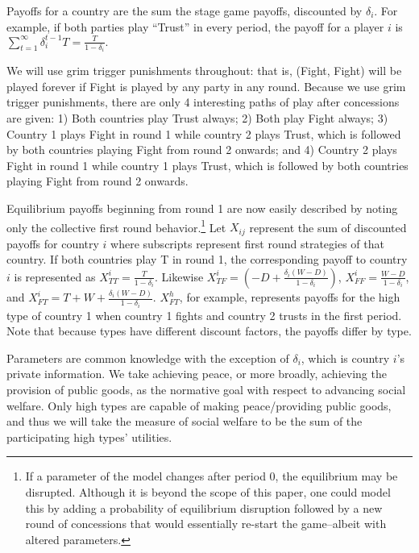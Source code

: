 \documentclass[12pt, letterpaper]{article}
\newcommand{\de}{\delta}
\begin{document}
Payoffs for a country are the sum the stage game payoffs, discounted by $\delta_i$. For example, if both parties play ``Trust'' in every period, the payoff for a player $i$ is $\sum_{t=1}^\infty \de_i^{t-1} T = \frac{T}{1-\de_i}.$

We will use grim trigger punishments throughout: that is, (Fight, Fight) will be played forever if Fight is played by any party in any round. Because we use grim trigger punishments, there are only 4 interesting paths of play after concessions are given:
1) Both countries play Trust always; 
2) Both play Fight always; 
3) Country 1 plays Fight in round 1 while country 2 plays Trust, which is followed by both countries playing Fight from round 2 onwards; and 
4) Country 2 plays Fight in round 1 while country 1 plays Trust, which is followed by both countries playing Fight from round 2 onwards.

Equilibrium payoffs beginning from round 1 are now easily described by noting only the collective first round behavior.\footnote{If a parameter of the model changes after period 0, the equilibrium may be disrupted. Although it is beyond the scope of this paper, one could model this by adding a probability of equilibrium disruption followed by a new round of concessions that would essentially re-start the game--albeit with altered parameters.} Let $X_{ij}$ represent the sum of discounted payoffs for country $i$ where subscripts represent first round strategies of that country. If both countries play T in round 1, the corresponding payoff to country $i$ is represented as $ X_{TT}^i=\frac {T}{1- \delta_i}$. Likewise $X_{TF}^i=({-D}+\frac{\delta_i(W-D)}{1- \delta_i} )$, $ X_{FF}^i=\frac{W-D}{1- \delta_i}$, and  $X_{FT}^i=T+W +\frac{\delta_i(W-D)}{1- \delta_i}$. $X_{FT}^h$, for example, represents payoffs for the high type of country 1 when country 1 fights and country 2 trusts in the first period. Note that because types have different discount factors, the payoffs differ by type.

Parameters are common knowledge with the exception of $\delta_i$, which is country $i$'s private information. We take achieving peace, or more broadly, achieving the provision of public goods, as the normative goal with respect to advancing social welfare. Only high types are capable of making peace/providing public goods, and thus we will take the measure of social welfare to be the sum of the participating high types’ utilities.
\end{document}
